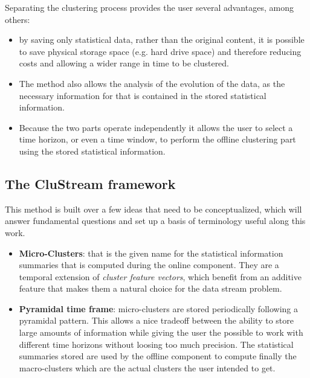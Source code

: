 \documentclass{llncs}
\begin{document}
Separating the clustering process provides the user several advantages, among others:

\begin{itemize}
 \item by saving only statistical data, rather than the original content, it is possible to save physical storage space (e.g. hard drive space) and therefore reducing costs and allowing a wider range in time to be clustered.
 
 \item The method also allows the analysis of the evolution of the data, as the necessary information for that is contained in the stored statistical information.
 
 \item Because the two parts operate independently it allows the user to select a time horizon, or even a time window, to perform the offline clustering part using the stored statistical information.
\end{itemize}

\subsection{The CluStream framework}

This method is built over a few ideas that need to be conceptualized, which will answer fundamental questions and set up a basis of terminology useful along this work.

\begin{itemize}
 \item \textbf{Micro-Clusters}: that is the given name for the statistical information summaries that is computed during the online component. They are a temporal extension of \textit{cluster feature vectors}\cite{zhang96birch}, which benefit from an additive feature that makes them a natural choice for the data stream problem\cite{clustreamOrig}.
 
 \item \textbf{Pyramidal time frame}: micro-clusters are stored periodically following a pyramidal pattern. This allows a nice tradeoff between the ability to store large amounts of information while giving the user the possible to work with different time horizons without loosing too much precision. The statistical summaries stored are used by the offline component to compute finally the macro-clusters which are the actual clusters the user intended to get.
\end{itemize}
\end{document}
